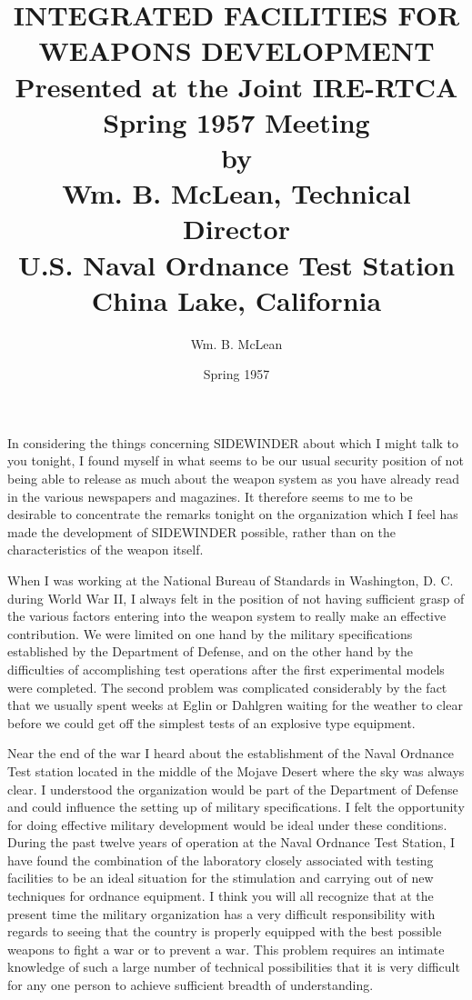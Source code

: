 \documentclass{memoir}
\title{%
  INTEGRATED FACILITIES FOR WEAPONS DEVELOPMENT \\
  \large Presented at the Joint IRE-RTCA Spring 1957 Meeting \\
         by \\
         Wm. B. McLean, Technical Director \\
         U.S. Naval Ordnance Test Station \\
         China Lake, California
}
\author{Wm. B. McLean}
\date{Spring 1957}
\begin{document}
\maketitle

In considering the things concerning SIDEWINDER about which I might talk to you tonight, I found myself in what seems to be our usual security position of not being able to release as much about the weapon system as you have already read in the various newspapers and magazines. It therefore seems to me to be desirable to concentrate the remarks tonight on the organization which I feel has made the development of SIDEWINDER possible, rather than on the characteristics of the weapon itself.

When I was working at the National Bureau of Standards in Washington, D. C. during World War II, I always felt in the position of not having sufficient grasp of the various factors entering into the weapon system to really make an effective contribution. We were limited on one hand by the military specifications established by the Department of Defense, and on the other hand by the difficulties of accomplishing test operations after the first experimental models were completed. The second problem was complicated considerably by the fact that we usually spent weeks at Eglin or Dahlgren waiting for the weather to clear before we could get off the simplest tests of an explosive type equipment.

Near the end of the war I heard about the establishment of the Naval Ordnance Test station located in the middle of the Mojave Desert where the sky was always clear. I understood the organization would be part of the Department of Defense and could influence the setting up of military specifications. I felt the opportunity for doing effective military development would be ideal under these conditions. During the past twelve years of operation at the Naval Ordnance Test Station, I have found the combination of the laboratory closely associated with testing facilities to be an ideal situation for the stimulation and carrying out of new techniques for ordnance equipment. I think you will all recognize that at the present time the military organization has a very difficult responsibility with regards to seeing that the country is properly equipped with the best possible weapons to fight a war or to prevent a war. This problem requires an intimate knowledge of such a large number of technical possibilities that it is very difficult for any one person to achieve sufficient breadth of understanding.
\end{document}
